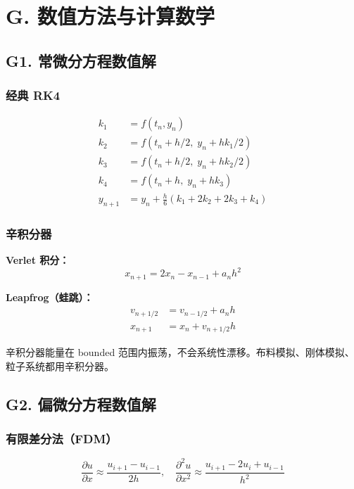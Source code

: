 \section{G. 数值方法与计算数学}

\subsection{G1. 常微分方程数值解}

\subsubsection{经典 RK4}

\begin{align*}
k_1 &= f(t_n, y_n) \\
k_2 &= f(t_n + h/2,\; y_n + hk_1/2) \\
k_3 &= f(t_n + h/2,\; y_n + hk_2/2) \\
k_4 &= f(t_n + h,\; y_n + hk_3) \\
y_{n+1} &= y_n + \frac{h}{6}(k_1 + 2k_2 + 2k_3 + k_4)
\end{align*}

\subsubsection{辛积分器}

\textbf{Verlet 积分：}
\[
x_{n+1} = 2x_n - x_{n-1} + a_n h^2
\]

\textbf{Leapfrog（蛙跳）：}
\begin{align*}
v_{n+1/2} &= v_{n-1/2} + a_n h \\
x_{n+1} &= x_n + v_{n+1/2} h
\end{align*}

辛积分器能量在 bounded 范围内振荡，不会系统性漂移。布料模拟、刚体模拟、粒子系统都用辛积分器。

\subsection{G2. 偏微分方程数值解}
\label{subsec:pde-numerics}

\subsubsection{有限差分法（FDM）}

\[
\frac{\partial u}{\partial x} \approx \frac{u_{i+1} - u_{i-1}}{2h}, \quad
\frac{\partial^2 u}{\partial x^2} \approx \frac{u_{i+1} - 2u_i + u_{i-1}}{h^2}
\]

